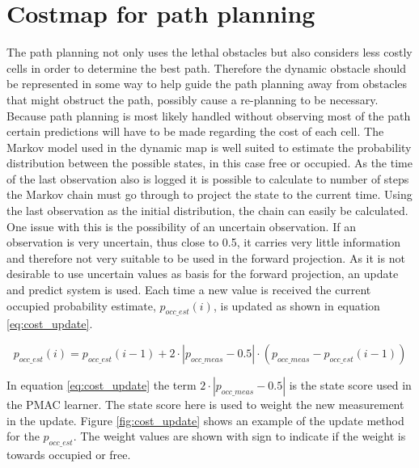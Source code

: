 \section{Costmap for path planning}
The path planning not only uses the lethal obstacles but also considers less costly cells in order to determine the best path. Therefore the dynamic obstacle should be represented in some way to help guide the path planning away from obstacles that might obstruct the path, possibly cause a re-planning to be necessary. Because path planning is most likely handled without observing most of the path certain predictions will have to be made regarding the cost of each cell. The Markov model used in the dynamic map is well suited to estimate the probability distribution between the possible states, in this case free or occupied. 
As the time of the last observation also is logged it is possible to calculate to number of steps the Markov chain must go through to project the state to the current time. Using the last observation as the initial distribution, the chain can easily be calculated. One issue with this is the possibility of an uncertain observation. If an observation is very uncertain, thus close to 0.5, it carries very little information and therefore not very suitable to be used in the forward projection. As it is not desirable to use uncertain values as basis for the forward projection, an update and predict system is used. Each time a new value is received the current occupied probability estimate, \(p_{occ\_est}(i)\), is updated as shown in equation \ref{eq:cost_update}.

\begin{equation}
\label{eq:cost_update}
p_{occ\_est}(i) = p_{occ\_est}(i-1) +  2 \cdot |p_{occ\_meas} - 0.5| \cdot (p_{occ\_meas} - p_{occ\_est}(i-1))
\end{equation}

In equation \ref{eq:cost_update} the term  \(2 \cdot |p_{occ\_meas} -0.5|\) is the state score used in the PMAC learner. The state score here is used to weight the new measurement in the update. Figure \ref{fig:cost_update} shows an example of the update method for the \(p_{occ\_est}\). The weight values are shown with sign to indicate if the weight is towards occupied or free. 

